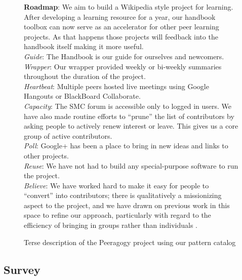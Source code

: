 \documentclass{acm_proc_article-sp}
\newenvironment{cframed}[1][blue]
  {\def\FrameCommand{\fboxsep=\FrameSep\fcolorbox{#1}{white}}%
    \MakeFramed {\advance\hsize-\width \FrameRestore}}
  {\endMakeFramed}
\begin{document}
\begin{figure}[h]
\begin{cframed}[black]
{\bf Roadmap}: We aim to build a Wikipedia style project for
learning. After developing a learning resource for a year, our handbook toolbox can now serve as an accelerator for other peer learning projects. As that happens those projects will feedback into the handbook itself making it more useful. \\

\emph{Guide}: The Handbook is our guide for ourselves and newcomers. \\

\emph{Wrapper}: Our wrapper provided weekly or
bi-weekly summaries throughout the duration of the project. \\

\emph{Heartbeat}: Multiple peers hosted live meetings using Google Hangouts or BlackBoard Collaborate. \\

\emph{Capacity}: The SMC forum is accessible only to logged in
users. We have also made routine efforts to ``prune'' the list of
contributors by asking people to actively renew interest or leave.
This gives us a core group of active contributors. \\

\emph{Poll}: Google+ has been a place to bring in new ideas and links to other projects. \\

\emph{Reuse}: We have not had to build any special-purpose software to
run the project.  \\

\emph{Believe}: We have worked hard to make it easy for people to ``convert''
into contributors; there is qualitatively a missionizing aspect to the
project, and we have drawn on previous work in this space to refine
our approach, particularly with regard to the efficiency of bringing
in groups rather than individuals \cite{Bridges}.
\end{cframed}
\vspace{-.2in}
\caption{Terse description of the Peeragogy project using our pattern catalog \label{catalog}}
\end{figure}

\subsection{Survey} \label{survey}
\end{document}
